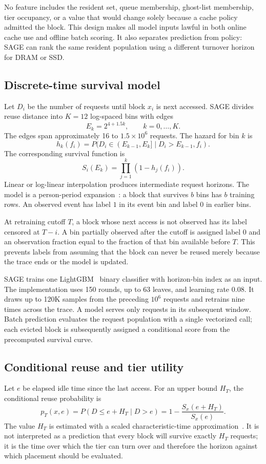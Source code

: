 \documentclass[conference]{IEEEtran}
\begin{document}
No feature includes the resident set, queue membership, ghost-list membership, tier occupancy, or a value that would change solely because a cache policy admitted the block. This design makes all model inputs lawful in both online cache use and offline batch scoring. It also separates prediction from policy: SAGE can rank the same resident population using a different turnover horizon for DRAM or SSD.

\subsection{Discrete-time survival model}\label{sec:model}
Let $D_i$ be the number of requests until block $x_i$ is next accessed. SAGE divides reuse distance into $K=12$ log-spaced bins with edges
\[
E_k=2^{4+1.5k},\qquad k=0,\ldots,K.
\]
The edges span approximately 16 to $1.5\times10^6$ requests. The hazard for bin $k$ is
\[
h_k(f_i)=P(D_i\in(E_{k-1},E_k]\mid D_i>E_{k-1},f_i).
\]
The corresponding survival function is
\[
S_i(E_k)=\prod_{j=1}^{k}(1-h_j(f_i)).
\]
Linear or log-linear interpolation produces intermediate request horizons. The model is a person-period expansion~\cite{singer}: a block that survives $b$ bins has $b$ training rows. An observed event has label $1$ in its event bin and label $0$ in earlier bins.

At retraining cutoff $T$, a block whose next access is not observed has its label censored at $T-i$. A bin partially observed after the cutoff is assigned label $0$ and an observation fraction equal to the fraction of that bin available before $T$. This prevents labels from assuming that the block can never be reused merely because the trace ends or the model is updated.

SAGE trains one LightGBM~\cite{lightgbm} binary classifier with horizon-bin index as an input. The implementation uses 150 rounds, up to 63 leaves, and learning rate $0.08$. It draws up to 120K samples from the preceding $10^6$ requests and retrains nine times across the trace. A model serves only requests in its subsequent window. Batch prediction evaluates the request population with a single vectorized call; each evicted block is subsequently assigned a conditional score from the precomputed survival curve.

\subsection{Conditional reuse and tier utility}
Let $e$ be elapsed idle time since the last access. For an upper bound $H_T$, the conditional reuse probability is
\[
p_T(x,e)
 =P(D\leq e+H_T\mid D>e)
 =1-\frac{S_x(e+H_T)}{S_x(e)}.
\]
The value $H_T$ is estimated with a scaled characteristic-time approximation~\cite{che}. It is not interpreted as a prediction that every block will survive exactly $H_T$ requests; it is the time over which the tier can turn over and therefore the horizon against which placement should be evaluated.
\end{document}
